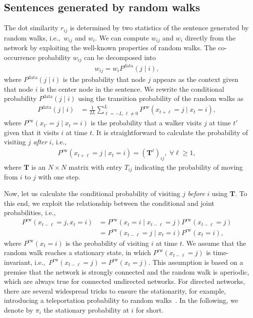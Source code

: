 \documentclass[12pt]{article} %
\def\given{\mid}
\def\ie{i.e.,~}
\def\mat#1{\mathbf{#1}}
\begin{document}
\subsection{Sentences generated by random walks}

The dot similarity $r_{ij}$ is determined by two statistics of the sentence generated by random walks, \ie $w_{ij}$ and $w_{i}$.
We can compute $w_{ij}$ and $w_{i}$ directly from the network by exploiting the well-known properties of random walks.
The co-occurrence probability $w_{ij}$ can be decomposed into
\begin{align}
    \label{eq:jgiveni}
    w_{ij} = w_i P^{\text{data}}(j \given i),
\end{align}
where $P^{\text{data}}(j\given i)$ is the probability that node $j$ appears as the context given that node $i$ is the center node in the sentence.
We rewrite the conditional probability $P^{\text{data}}(j \given i)$ using the transition probability of the random walks as
\begin{align}
    P^{\text{data}}(j \given i) & = \frac{1}{2L} \sum_{\ell = -L, \ell\neq 0}^L P^{\text{rw}}(x_{t+\ell}=j\given x_{t} = i),
\end{align}
where $P^{\text{rw}}(x_{t'}=j \given x_{t}=i)$ is the probability that a walker visits $j$ at time $t'$ given that it visits $i$ at time $t$.
It is straightforward to calculate the probability of visiting $j$ \textit{after} $i$, \ie
\begin{align}
    P^{\text{rw}}(x_{t+\ell}=j\given x_{t} = i) = (\mat{T}^\ell)_{ij},\; \forall \ell\geq 1, \label{eq:jgiveni_after}
\end{align}
where $\mat{T}$ is an $N\times N$ matrix with entry $T_{ij}$ indicating the probability of moving from $i$ to $j$ with one step.

Now, let us calculate the conditional probability of visiting $j$ {\it before} $i$ using $\mat{T}$.
To this end, we exploit the relationship between the conditional and joint probabilities, \ie
\begin{align}
    P^{\text{rw}}(x_{t-\ell}=j, x_{t} = i) & = P^{\text{rw}}(x_{t} = i \given x_{t-\ell}=j)P^{\text{rw}}(x_{t-\ell} = j) \nonumber         \\
                                           & = P^{\text{rw}}(x_{t-\ell} = j \given x_{t}=i)P^{\text{rw}}(x_{t} = i), \label{eq:cond-joint}
\end{align}
where $P^{\text{rw}}(x_{t} = i)$ is the probability of visiting $i$ at time $t$.
We assume that the random walk reaches a stationary state, in which $P^{\text{rw}}(x_{t-\ell} = j)$ is time-invariant, \ie $P^{\text{rw}}(x_{t-\ell} = j) = P^{\text{rw}}(x_{t} = j)$.
This assumption is based on a premise that the network is strongly connected and the random walk is aperiodic, which are always true for connected undirected networks.
For directed networks, there are several widespread tricks to ensure the stationarity, for example, introducing a teleportation probability to random walks~\cite{Lambiotte2012}.
In the following, we denote by $\pi_i$ the stationary probability at $i$ for short.
\end{document}
